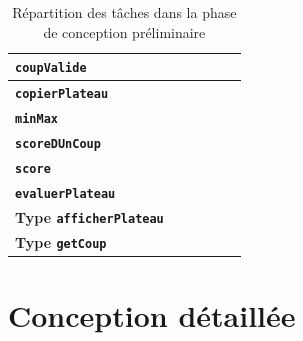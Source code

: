 \documentclass[11pt]{report}
\begin{document}
\begin{table}[h]
\begin{center}
\begin{tabular}{|l|c|c|c|c|c|}
 		  		\textbf{\texttt{coupValide}} & & & &  \cellcolor{lightgray}&  \cellcolor{lightgray}  \\\hline
  		\textbf{\texttt{copierPlateau}} & & & &  \cellcolor{lightgray}&  \cellcolor{lightgray}  \\\hline
   		\textbf{\texttt{minMax}} & & & &  \cellcolor{lightgray}&  \cellcolor{lightgray}  \\\hline
   		 		\textbf{\texttt{scoreDUnCoup}} & & & &  \cellcolor{lightgray}&  \cellcolor{lightgray}  \\\hline
   	 		\textbf{\texttt{score}} & & & &  \cellcolor{lightgray}&  \cellcolor{lightgray}  \\\hline
   	 		 		\textbf{\texttt{evaluerPlateau}} & & & &  \cellcolor{lightgray}&  \cellcolor{lightgray}  \\\hline
   	\textbf{Type \texttt{afficherPlateau}} & \cellcolor{lightgray} & \cellcolor{lightgray} & \cellcolor{lightgray} & & \\\hline
   	 		 \textbf{Type \texttt{getCoup}} & & & & \cellcolor{lightgray}& \cellcolor{lightgray}\\\hline
\end{tabular}
\end{center}
\caption{Répartition des tâches dans la phase de conception préliminaire}
\end{table}

\chapter{Conception détaillée}
\end{document}
